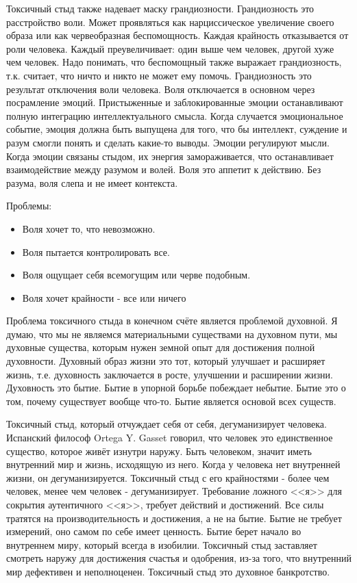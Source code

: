 \documentclass[10pt, fleqn]{article}
\begin{document}
Токсичный стыд также надевает маску грандиозности. Грандиозность это расстройство воли. Может проявляться как нарциссическое увеличение своего образа или как червеобразная беспомощность. Каждая крайность отказывается от роли человека. Каждый преувеличивает: один выше чем человек, другой хуже чем человек. Надо понимать, что беспомощный также выражает грандиозность, т.к. считает, что ничто и никто не может ему помочь.
Грандиозность это результат отключения воли человека. Воля отключается в основном через посрамление эмоций. Пристыженные и заблокированные эмоции останавливают полную интеграцию интеллектуального смысла. Когда случается эмоциональное событие, эмоция должна быть выпущена для того, что бы интеллект, суждение и разум смогли понять и сделать какие-то выводы. Эмоции регулируют мысли. Когда эмоции связаны стыдом, их энергия замораживается, что останавливает взаимодействие между разумом и волей.
Воля это аппетит к действию. Без разума, воля слепа и не имеет контекста.

Проблемы:
\begin{itemize}
\item Воля хочет то, что невозможно.
\item Воля пытается контролировать все.
\item Воля ощущает себя всемогущим или черве подобным.
\item Воля хочет крайности - все или ничего
\end{itemize}

Проблема токсичного стыда в конечном счёте является проблемой духовной. Я думаю, что мы не являемся материальными существами на духовном пути, мы духовные существа, которым нужен земной опыт для достижения полной духовности.
Духовный образ жизни это тот, который улучшает и расширяет жизнь, т.е. духовность заключается в росте, улучшении и расширении жизни. Духовность это бытие. Бытие в упорной борьбе побеждает небытие. Бытие это о том, почему существует вообще что-то. Бытие является основой всех существ.


Токсичный стыд, который отчуждает себя от себя, дегуманизирует человека. Испанский философ Ortega Y. Gasset говорил, что человек это единственное существо, которое живёт изнутри наружу. Быть человеком, значит иметь внутренний мир и жизнь, исходящую из него. Когда у человека нет внутренней жизни, он дегуманизируется.
Токсичный стыд с его крайностями - более чем человек, менее чем человек - дегуманизирует. Требование ложного <<я>> для сокрытия аутентичного <<я>>, требует действий и достижений. Все силы тратятся на производительность и достижения, а не на бытие. Бытие не требует измерений, оно самом по себе имеет ценность. Бытие берет начало во внутреннем миру, который всегда в изобилии.
Токсичный стыд заставляет смотреть наружу для достижения счастья и одобрения, из-за того, что внутренний мир дефективен и неполноценен. Токсичный стыд это духовное банкротство.
\end{document}
